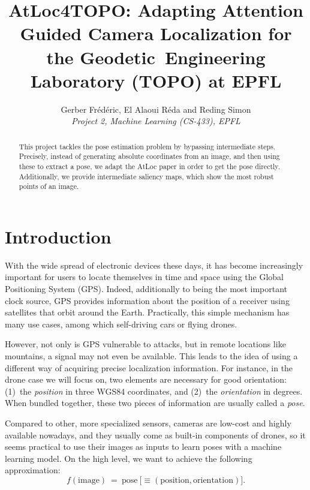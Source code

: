 \documentclass[10pt,conference,compsocconf]{IEEEtran}
\begin{document}
\title{AtLoc4TOPO: Adapting Attention Guided Camera Localization for the Geodetic~Engineering Laboratory (TOPO) at EPFL}

\author{
  Gerber Frédéric, El Alaoui Réda and Reding Simon\\
  \textit{Project 2, Machine Learning (CS-433), EPFL}
}

\maketitle


\begin{abstract}
This project tackles the pose estimation problem by bypassing intermediate steps. Precisely, instead of generating absolute coordinates from an image, and then using these to extract a pose, we adapt the AtLoc paper in order to get the pose directly. Additionally, we provide intermediate saliency maps, which show the most robust points of an image.
\end{abstract}


\section{Introduction}

With the wide spread of electronic devices these days, it has become increasingly important for users to locate themselves in time and space using the Global Positioning System (GPS). Indeed, additionally to being the most important clock source, GPS provides information about the position of a receiver using satellites that orbit around the Earth. Practically, this simple mechanism has many use cases, among which self-driving cars or flying drones.

However, not only is GPS vulnerable to attacks, but in remote locations like mountains, a signal may not even be available. This leads to the idea of using a different way of acquiring precise localization information. For instance, in the drone case we will focus on, two elements are necessary for good orientation: (1)~the \emph{position} in three WGS84 coordinates, and (2)~the \emph{orientation} in degrees. When bundled together, these two pieces of information are usually called a \emph{pose}.

Compared to other, more specialized sensors, cameras are low-cost and highly available nowadays, and they usually come as built-in components of drones, so it seems practical to use their images as inputs to learn poses with a machine learning model. On the high level, we want to achieve the following approximation:
\[ f(\mathrm{image})\ =\ \mathrm{pose}\ \big[\equiv (\mathrm{position}, \mathrm{orientation})\big]. \]
\end{document}

